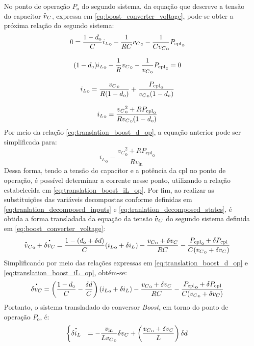 No ponto de operação $P_{\mathrm{o}}$ do segundo sistema, da equação que descreve a tensão do capacitor $\dt{v}_C$, expressa em \eqref{eq:boost_converter_voltage}, pode-se obter a próxima relação do segundo sistema: \begin{gather}
  0 = \frac{1 - d_{\mathrm{o}}}{C} {i_L}_{\mathrm{o}} - \frac{1}{RC}{v_C}_{\mathrm{o}} - \frac{1}{C{v_C}_{\mathrm{o}}}{P_{\mathrm{cpl}}}_{\mathrm{o}} \notag \\[8pt]
  (1 - d_{\mathrm{o}}){i_L}_{\mathrm{o}} - \frac{1}{R}{v_C}_{\mathrm{o}} - \frac{1}{{v_C}_{\mathrm{o}}}{P_{\mathrm{cpl}}}_{\mathrm{o}} = 0 \notag \\[8pt]
  {i_L}_{\mathrm{o}} = \frac{{v_C}_{\mathrm{o}}}{R(1-d_{\mathrm{o}})} + \frac{{P_{\mathrm{cpl}}}_{\mathrm{o}}}{{v_C}_{\mathrm{o}} (1 - d_{\mathrm{o}})} \notag \\[8pt]
  {i_L}_{\mathrm{o}} = \frac{{v_C}^2_{\mathrm{o}} + R{P_{\mathrm{cpl}}}_{\mathrm{o}}}{R{v_C}_{\mathrm{o}}(1 - d_{\mathrm{o}})}
\end{gather} Por meio da relação \eqref{eq:translation_boost_d_op}, a equação anterior pode ser simplificada para: \begin{equation}
  {i_L}_{\mathrm{o}} = \frac{{v_C}^2_{\mathrm{o}} + R{P_{\mathrm{cpl}}}_{\mathrm{o}}}{R{v_{\mathrm{in}}}}
  \label{eq:translation_boost_iL_op}
\end{equation} Dessa forma, tendo a tensão do capacitor e a potência da \acrshort{cpl} no ponto de operação, é possível determinar a corrente nesse ponto, utilizando a relação estabelecida em \eqref{eq:translation_boost_iL_op}. Por fim, ao realizar as substituições das variáveis decompostas conforme definidas em \eqref{eq:tranlation_decomposed_inputs} e \eqref{eq:tranlation_decomposed_states}, é obtida a forma transladada da equação da tensão $\dt{v}_C$ do segundo sistema definida em \eqref{eq:boost_converter_voltage}: \begin{gather}
  {{\dt{v}_C}}_{\mathrm{o}} + \dt{\delta {v}_C} = \frac{1 - (d_{\mathrm{o}} + \delta d)}{C} ( {i_L}_{\mathrm{o}} + \delta i_L) - \frac{{v_C}_{\mathrm{o}} + \delta v_C}{RC} - \frac{{{P_{\mathrm{cpl}}}_{\mathrm{o}} + \delta P_{\mathrm{cpl}}}}{C({v_C}_{\mathrm{o}} + \delta {v_C})}
\end{gather} Simplificando por meio das relações expressas em \eqref{eq:translation_boost_d_op} e \eqref{eq:translation_boost_iL_op}, obtém-se: \begin{gather}
  \dt{\delta {v}_C} = \left( \frac{1 - d_{\mathrm{o}}}{C} - \frac{\delta d}{C} \right)\left({i_L}_{\mathrm{o}} + \delta i_L\right) - \frac{{v_C}_{\mathrm{o}} + \delta v_C}{RC} - \frac{{{P_{\mathrm{cpl}}}_{\mathrm{o}} + \delta P_{\mathrm{cpl}}}}{C({v_C}_{\mathrm{o}} + \delta {v_C})}
\end{gather} Portanto, o sistema transladado do conversor \textit{Boost}, em torno do ponto de operação $P_{\mathrm{o}}$, é: \begin{equation}
  \begin{cases}
    \dt{\delta i_L}  &= \displaystyle - \frac{v_{\mathrm{in}}}{L{v_C}_{\mathrm{o}}}\delta v_C + \left(\frac{{v_C}_{\mathrm{o}} + \delta {v_C}}{L}\right) \delta d
    

\end{cases}
\end{equation}
